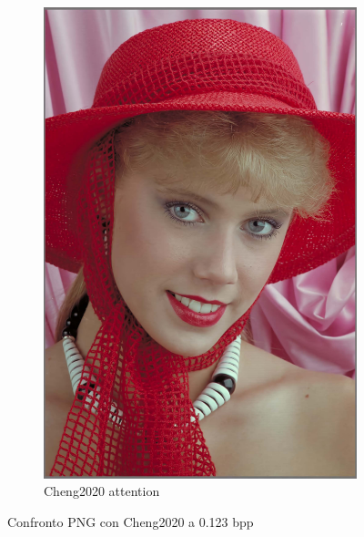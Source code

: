 \begin{figure}[t!]
\begin{subfigure}[]{0.25\textwidth}
        \includegraphics[width=\textwidth]{Immagini/IMAGES/cheng2020-anchor_3_IMG0004.pdf}
        \caption{Cheng2020 attention}
        \label{fig:CompressedCheng2020Attention}
    \end{subfigure}
    \caption{Confronto PNG con Cheng2020 a 0.123 bpp}
    \label{fig:CompressionCheng2020}
\end{figure}